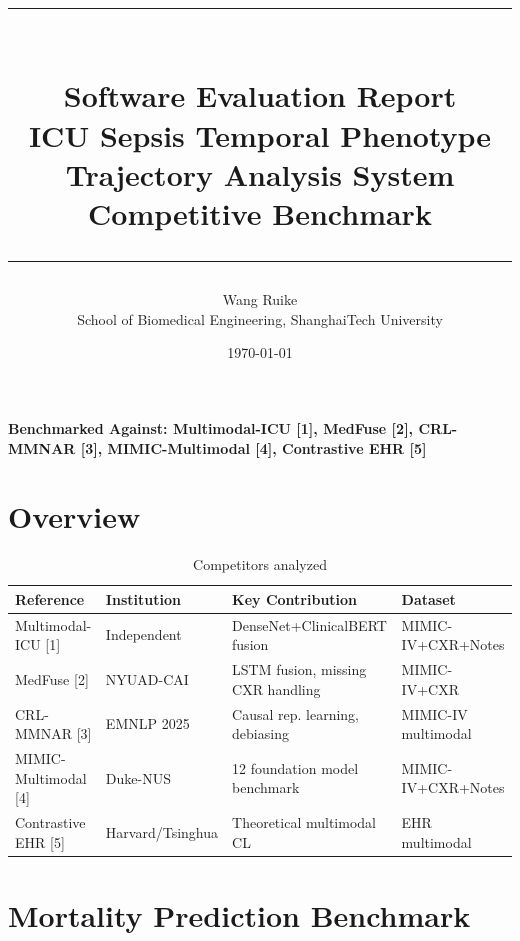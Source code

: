 \documentclass[11pt,a4paper]{article}
\title{%
    \vspace{-1cm}
    {\color{primary}\rule{\linewidth}{2pt}}\\[0.4cm]
    {\Huge\bfseries\color{primary} Software Evaluation Report}\\[0.3cm]
    {\Large\color{secondary} ICU Sepsis Temporal Phenotype}\\[-0.1cm]
    {\Large\color{secondary} Trajectory Analysis System}\\[0.2cm]
    {\large\color{accent}\faTrophy\hspace{0.5em}Competitive Benchmark\hspace{0.5em}\faTrophy}\\[0.3cm]
    {\color{primary}\rule{\linewidth}{2pt}}
}
\author{%
    \large Wang Ruike\\[0.2cm]
    \normalsize School of Biomedical Engineering, ShanghaiTech University
}
\date{\today}
\renewcommand{\arraystretch}{1.25}
\begin{document}
\maketitle
\thispagestyle{empty}

\vspace{0.3cm}
\begin{center}
\begin{tcolorbox}[
    enhanced,
    colback=lightbg,
    colframe=primary,
    width=0.95\textwidth,
    arc=3mm,
    boxrule=1pt,
]
\centering
\large\bfseries Benchmarked Against: \normalfont Multimodal-ICU [1], MedFuse [2], CRL-MMNAR [3], MIMIC-Multimodal [4], Contrastive EHR [5]
\end{tcolorbox}
\end{center}

\newpage
\tableofcontents
\newpage

\section{Overview}

\begin{table}[H]
\centering
\small
\renewcommand{\arraystretch}{1.3}
\begin{tabular}{p{3.2cm}p{2.8cm}p{4.5cm}p{3cm}}
\toprule
\rowcolor{tableheader}
\textbf{Reference} & \textbf{Institution} & \textbf{Key Contribution} & \textbf{Dataset} \\
\midrule
Multimodal-ICU [1] & Independent & DenseNet+ClinicalBERT fusion & MIMIC-IV+CXR+Notes \\
\rowcolor{lightbg}
MedFuse [2] & NYUAD-CAI & LSTM fusion, missing CXR handling & MIMIC-IV+CXR \\
CRL-MMNAR [3] & EMNLP 2025 & Causal rep. learning, debiasing & MIMIC-IV multimodal \\
\rowcolor{lightbg}
MIMIC-Multimodal [4] & Duke-NUS & 12 foundation model benchmark & MIMIC-IV+CXR+Notes \\
Contrastive EHR [5] & Harvard/Tsinghua & Theoretical multimodal CL & EHR multimodal \\
\bottomrule
\end{tabular}
\caption{Competitors analyzed}
\end{table}

\section{Mortality Prediction Benchmark}
\end{document}
